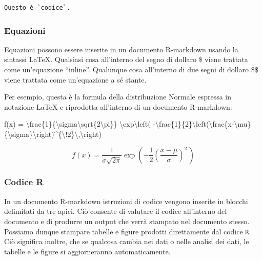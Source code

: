 \documentclass[
]{memoir}
\newenvironment{Shaded}{\begin{snugshade}}{\end{snugshade}}
\newcommand{\DecValTok}[1]{\textcolor[rgb]{0.00,0.00,0.81}{#1}}
\newcommand{\FunctionTok}[1]{\textcolor[rgb]{0.00,0.00,0.00}{#1}}
\newcommand{\NormalTok}[1]{#1}
\newcommand{\OtherTok}[1]{\textcolor[rgb]{0.56,0.35,0.01}{#1}}
\newcommand{\SpecialCharTok}[1]{\textcolor[rgb]{0.00,0.00,0.00}{#1}}
\theoremstyle{definition}
\theoremstyle{definition}
\theoremstyle{definition}
\theoremstyle{definition}
\theoremstyle{remark}
\begin{document}
\begin{verbatim}
Questo è `codice`.
\end{verbatim}

\hypertarget{equazioni}{%
\subsubsection{Equazioni}\label{equazioni}}

Equazioni possono essere inserite in un documento R-markdown usando la sintassi \LaTeX. Qualsiasi cosa all'interno del segno di dollaro \$ viene trattata come un'equazione ``inline''. Qualunque cosa all'interno di due segni di dollaro \$\$ viene trattata come un'equazione a sé stante.

Per esempio, questa è la formula della distribuzione Normale espressa in notazione LaTeX e riprodotta all'interno di un documento R-markdown:

\begin{Shaded}
\begin{Highlighting}[]
\FunctionTok{f}\NormalTok{(x) }\OtherTok{=}\NormalTok{ \textbackslash{}frac\{}\DecValTok{1}\NormalTok{\}\{\textbackslash{}sigma\textbackslash{}sqrt\{}\DecValTok{2}\NormalTok{\textbackslash{}pi\}\}}
\NormalTok{  \textbackslash{}exp\textbackslash{}}\FunctionTok{left}\NormalTok{( }\SpecialCharTok{{-}}\NormalTok{\textbackslash{}frac\{}\DecValTok{1}\NormalTok{\}\{}\DecValTok{2}\NormalTok{\}\textbackslash{}}\FunctionTok{left}\NormalTok{(\textbackslash{}frac\{x}\SpecialCharTok{{-}}\NormalTok{\textbackslash{}mu\}\{\textbackslash{}sigma\}\textbackslash{}right)}\SpecialCharTok{\^{}}\NormalTok{\{\textbackslash{}}\SpecialCharTok{!}\DecValTok{2}\NormalTok{\}\textbackslash{},\textbackslash{}right)}
\end{Highlighting}
\end{Shaded}

\[
f(x) = \frac{1}{\sigma\sqrt{2\pi}}
  \exp\left( -\frac{1}{2}\left(\frac{x-\mu}{\sigma}\right)^{\!2}\,\right)
\]

\hypertarget{codice-r}{%
\subsubsection{Codice R}\label{codice-r}}

In un documento R-markdown istruzioni di codice vengono inserite in blocchi delimitati da tre apici. Ciò consente di valutare il codice all'interno del documento e di produrre un output che verrà stampato nel documento stesso. Possiamo dunque stampare tabelle e figure prodotti direttamente dal codice \texttt{R}. Ciò significa inoltre, che se qualcosa cambia nei dati o nelle analisi dei dati, le tabelle e le figure si aggiorneranno automaticamente.
\end{document}
